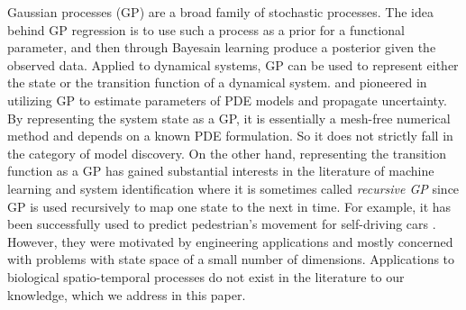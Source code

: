 \documentclass[smallextended,natbib]{svjour3}       %
\begin{document}
Gaussian processes (GP) are a broad family of  stochastic processes.  The idea behind GP regression is to use such a process as a prior for a functional parameter, and then through Bayesain learning produce a posterior given the observed data. Applied to dynamical systems, GP can be used to represent either the state or the transition function of a dynamical system. \cite{Raissi2018} and \cite{Raissi2018a} pioneered in utilizing GP to estimate parameters of PDE models and propagate uncertainty.  By representing the system state as a GP, it is essentially a mesh-free numerical method and depends on a known PDE formulation. So it does not strictly fall in the category of model discovery. On the other hand, representing the transition function as a GP has gained substantial interests in the literature of machine learning and system identification \citep{girard2003gaussian,deisenroth2009analytic} where it is sometimes called \emph{recursive GP} since GP is used recursively to map one state to the next in time. For example, it has been successfully used to predict pedestrian's movement for self-driving cars \citep{Wang2008}. However, they were motivated by engineering applications and mostly concerned with problems with state space of a small number of dimensions. Applications to biological spatio-temporal processes do not exist in the literature to our knowledge, which we address in this paper.
\end{document}
